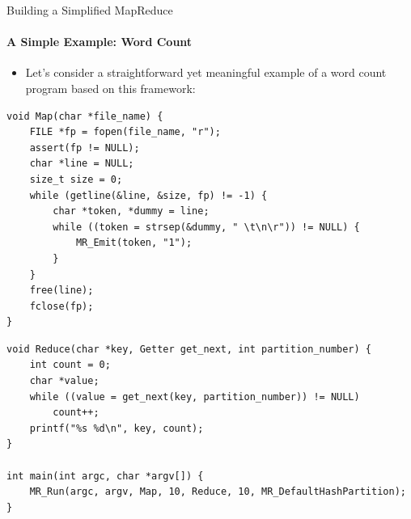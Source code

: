 \documentclass[10pt]{beamer}
\begin{document}
\begin{frame}[fragile]{Building a Simplified MapReduce}
    \framesubtitle{A Simple Example: Word Count}
    \begin{itemize}
        \item Let's consider a straightforward yet meaningful example of a word count program based on this framework:
    \end{itemize}
    \begin{minipage}{.54\linewidth}
        \begin{lstlisting}
void Map(char *file_name) {
    FILE *fp = fopen(file_name, "r");
    assert(fp != NULL);
    char *line = NULL;
    size_t size = 0;
    while (getline(&line, &size, fp) != -1) {
        char *token, *dummy = line;
        while ((token = strsep(&dummy, " \t\n\r")) != NULL) {
            MR_Emit(token, "1");
        }
    }
    free(line);
    fclose(fp);
}
\end{lstlisting}
    \end{minipage}
    \hspace{13pt}
    \begin{minipage}{.45\linewidth}
        \begin{lstlisting}
void Reduce(char *key, Getter get_next, int partition_number) {
    int count = 0;
    char *value;
    while ((value = get_next(key, partition_number)) != NULL)
        count++;
    printf("%s %d\n", key, count);
}

int main(int argc, char *argv[]) {
    MR_Run(argc, argv, Map, 10, Reduce, 10, MR_DefaultHashPartition);
}
    \end{lstlisting}
    \end{minipage}
\end{frame}
\end{document}
